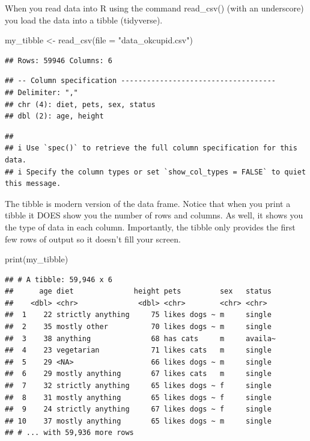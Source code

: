 \documentclass[
]{krantz}
\makeatletter
\newenvironment{Shaded}{\begin{snugshade}}{\end{snugshade}}
\newcommand{\AttributeTok}[1]{\textcolor[rgb]{0.61,0.61,0.61}{#1}}
\newcommand{\FunctionTok}[1]{\textcolor[rgb]{0,0,0}{#1}}
\newcommand{\NormalTok}[1]{#1}
\newcommand{\OtherTok}[1]{\textcolor[rgb]{0.37,0.37,0.37}{#1}}
\newcommand{\StringTok}[1]{\textcolor[rgb]{0.5,0.5,0.5}{#1}}
\newenvironment{kframe}{%
\medskip{}
\setlength{\fboxsep}{.8em}
 \def\at@end@of@kframe{}%
 \ifinner\ifhmode%
  \def\at@end@of@kframe{\end{minipage}}%
  \begin{minipage}{\columnwidth}%
 \fi\fi%
 \def\FrameCommand##1{\hskip\@totalleftmargin \hskip-\fboxsep
 \colorbox{shadecolor}{##1}\hskip-\fboxsep
     \hskip-\linewidth \hskip-\@totalleftmargin \hskip\columnwidth}%
 \MakeFramed {\advance\hsize-\width
   \@totalleftmargin\z@ \linewidth\hsize
   \@setminipage}}%
 {\par\unskip\endMakeFramed%
 \at@end@of@kframe}
\renewenvironment{Shaded}{\begin{kframe}}{\end{kframe}}
\makeatother
\begin{document}
When you read data into R using the command read\_csv() (with an underscore) you load the data into a tibble (tidyverse).

\begin{Shaded}
\begin{Highlighting}[]
\NormalTok{my\_tibble }\OtherTok{\textless{}{-}} \FunctionTok{read\_csv}\NormalTok{(}\AttributeTok{file =} \StringTok{"data\_okcupid.csv"}\NormalTok{)}
\end{Highlighting}
\end{Shaded}

\begin{verbatim}
## Rows: 59946 Columns: 6
\end{verbatim}

\begin{verbatim}
## -- Column specification ------------------------------------
## Delimiter: ","
## chr (4): diet, pets, sex, status
## dbl (2): age, height
\end{verbatim}

\begin{verbatim}
## 
## i Use `spec()` to retrieve the full column specification for this data.
## i Specify the column types or set `show_col_types = FALSE` to quiet this message.
\end{verbatim}

The tibble is modern version of the data frame. Notice that when you print a tibble it DOES show you the number of rows and columns. As well, it shows you the type of data in each column. Importantly, the tibble only provides the first few rows of output so it doesn't fill your screen.

\begin{Shaded}
\begin{Highlighting}[]
\FunctionTok{print}\NormalTok{(my\_tibble)}
\end{Highlighting}
\end{Shaded}

\begin{verbatim}
## # A tibble: 59,946 x 6
##      age diet              height pets         sex   status 
##    <dbl> <chr>              <dbl> <chr>        <chr> <chr>  
##  1    22 strictly anything     75 likes dogs ~ m     single 
##  2    35 mostly other          70 likes dogs ~ m     single 
##  3    38 anything              68 has cats     m     availa~
##  4    23 vegetarian            71 likes cats   m     single 
##  5    29 <NA>                  66 likes dogs ~ m     single 
##  6    29 mostly anything       67 likes cats   m     single 
##  7    32 strictly anything     65 likes dogs ~ f     single 
##  8    31 mostly anything       65 likes dogs ~ f     single 
##  9    24 strictly anything     67 likes dogs ~ f     single 
## 10    37 mostly anything       65 likes dogs ~ m     single 
## # ... with 59,936 more rows
\end{verbatim}
\end{document}
